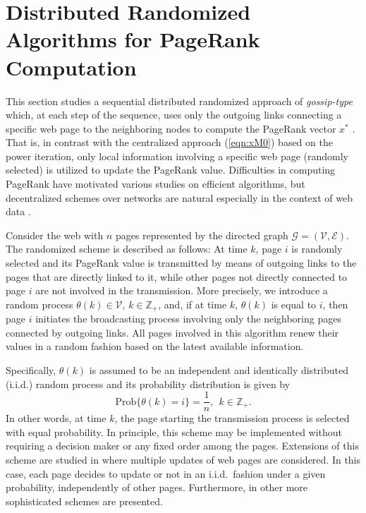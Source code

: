 \documentclass[11pt,draftcls,onecolumn]{IEEEtran}
\newcommand{\field}[1]{{\mathbb{#1}}}
\newcommand{\Prob}{\mathrm{Prob}}
\newcommand{\Z}{\field{Z}}
\begin{document}
\section*{Distributed Randomized Algorithms for PageRank Computation}

This section studies a sequential distributed randomized approach of {\it gossip-type} which, 
at each step of the sequence, uses only the outgoing links connecting a specific web page to 
the neighboring nodes to compute the PageRank vector $x^*$ \cite{IshTem:10}. That is, in contrast with  
the centralized approach (\ref{eqn:xM0}) based on the power iteration, only local information 
involving a specific web page (randomly selected) is utilized to update the PageRank value. 
Difficulties in computing PageRank have motivated various studies on efficient algorithms,
but decentralized schemes over networks \cite{BerTsi:89} 
are natural especially in the context of web data \cite{ZhaChFa:13,Nesterov:12,Necoara:13}. 

Consider the web with $n$ pages represented by the directed graph $\mathcal{G}=(\mathcal{V},\mathcal{E})$. 
The randomized scheme is described as follows:
At time $k$, page $i$ is randomly selected and its PageRank value is transmitted by means of outgoing 
links to the pages that are directly linked to it, while other pages not directly connected to 
page $i$ are not involved in the transmission.
More precisely, we introduce a random process $\theta(k)\in\mathcal{V}$, $k\in\Z_+$, and, if 
at time $k$, $\theta(k)$ is equal to $i$, then page $i$ initiates the broadcasting process 
involving only the neighboring pages connected by outgoing links. All pages involved in this 
algorithm renew their values in a random fashion based on the latest available information.  

Specifically, $\theta(k)$ is assumed to be an independent and identically distributed (i.i.d.)
random process and its probability distribution is given by
\begin{equation}
  \Prob\{\theta(k)=i\} = \frac{1}{n},~~k\in\Z_+.
\label{eqn:theta1}
\end{equation}
In other words, at time $k$, the page starting the transmission process is selected with equal probability.  In principle, 
this scheme may be implemented without requiring 
a decision maker or any fixed order among the pages. Extensions of this scheme are studied in \cite{IshTem:10}
where multiple updates of web pages are considered. 
In this case, each page decides to update or not 
in an i.i.d.\ fashion under a given probability, independently of other pages. Furthermore, in \cite{IshTemBaiDab:09}
other more sophisticated schemes are presented.
\end{document}
